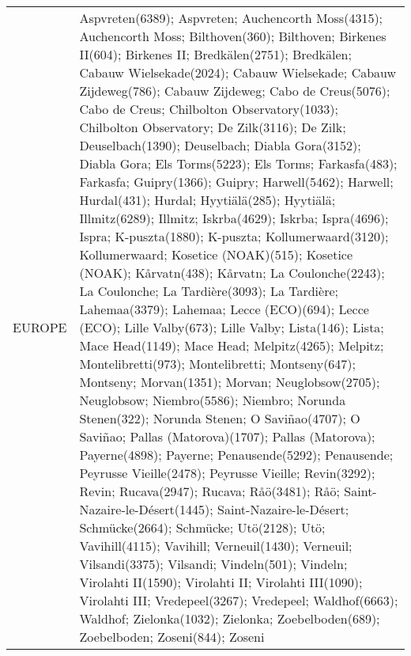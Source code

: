 \documentclass[journal abbreviation, manuscript]{copernicus}
\begin{document}
\begin{table}
\begin{tabularx}{\textwidth}{lX}
  EUROPE   & Aspvreten(6389); Aspvreten; Auchencorth Moss(4315); Auchencorth Moss; Bilthoven(360); Bilthoven; Birkenes II(604); Birkenes II; Bredkälen(2751); Bredkälen; Cabauw Wielsekade(2024); Cabauw Wielsekade; Cabauw Zijdeweg(786); Cabauw Zijdeweg; Cabo de Creus(5076); Cabo de Creus; Chilbolton Observatory(1033); Chilbolton Observatory; De Zilk(3116); De Zilk; Deuselbach(1390); Deuselbach; Diabla Gora(3152); Diabla Gora; Els Torms(5223); Els Torms; Farkasfa(483); Farkasfa; Guipry(1366); Guipry; Harwell(5462); Harwell; Hurdal(431); Hurdal; Hyytiälä(285); Hyytiälä; Illmitz(6289); Illmitz; Iskrba(4629); Iskrba; Ispra(4696); Ispra; K-puszta(1880); K-puszta; Kollumerwaard(3120); Kollumerwaard; Kosetice (NOAK)(515); Kosetice (NOAK); Kårvatn(438); Kårvatn; La Coulonche(2243); La Coulonche; La Tardière(3093); La Tardière; Lahemaa(3379); Lahemaa; Lecce (ECO)(694); Lecce (ECO); Lille Valby(673); Lille Valby; Lista(146); Lista; Mace Head(1149); Mace Head; Melpitz(4265); Melpitz; Montelibretti(973); Montelibretti; Montseny(647); Montseny; Morvan(1351); Morvan; Neuglobsow(2705); Neuglobsow; Niembro(5586); Niembro; Norunda Stenen(322); Norunda Stenen; O Saviñao(4707); O Saviñao; Pallas (Matorova)(1707); Pallas (Matorova); Payerne(4898); Payerne; Penausende(5292); Penausende; Peyrusse Vieille(2478); Peyrusse Vieille; Revin(3292); Revin; Rucava(2947); Rucava; Råö(3481); Råö; Saint-Nazaire-le-Désert(1445); Saint-Nazaire-le-Désert; Schmücke(2664); Schmücke; Utö(2128); Utö; Vavihill(4115); Vavihill; Verneuil(1430); Verneuil; Vilsandi(3375); Vilsandi; Vindeln(501); Vindeln; Virolahti II(1590); Virolahti II; Virolahti III(1090); Virolahti III; Vredepeel(3267); Vredepeel; Waldhof(6663); Waldhof; Zielonka(1032); Zielonka; Zoebelboden(689); Zoebelboden; Zoseni(844); Zoseni                                                                                                                                                                                                                                                                                                                                                                                                                                                                                                                                                                                                                                                                                                                                                                                                                                                                                                                                                                                                                                                                                                                                                                                                                                                                                                                                                                                                                                                                                                                                                                   
\end{tabularx}
\end{table}
\end{document}
